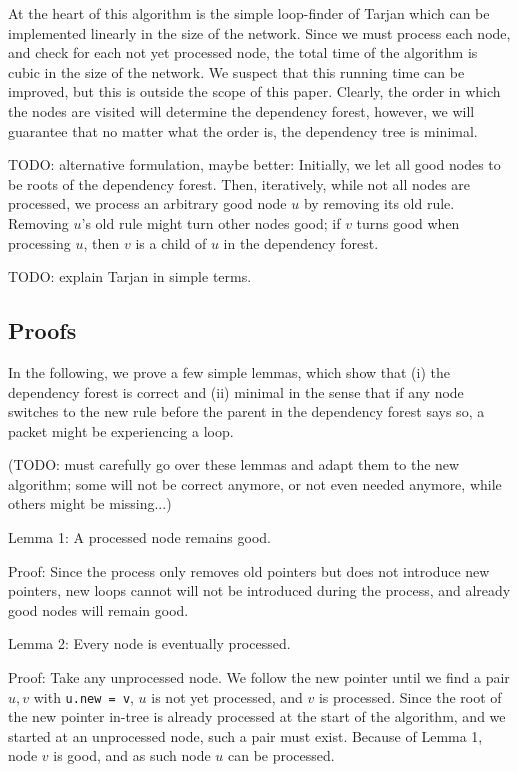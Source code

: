 At the heart of this algorithm is the simple loop-finder of Tarjan \cite{reference_1_in_http://en.wikipedia.org/wiki/Tarjan's_strongly_connected_components_algorithm} which can be implemented linearly in the size of the network. Since we must process each node, and check for each not yet processed node, the total time of the algorithm is cubic in the size of the network. We suspect that this running time can be improved, but this is outside the scope of this paper. Clearly, the order in which the nodes are visited will determine the dependency forest, however, we will guarantee that no matter what the order is, the dependency tree is minimal.

TODO: alternative formulation, maybe better: Initially, we let all good nodes to be roots of the dependency forest. Then, iteratively, while not all nodes are processed, we process an arbitrary good node $u$ by removing its old rule. Removing $u$'s old rule might turn other nodes good; if $v$ turns good when processing $u$, then $v$ is a child of $u$ in the dependency forest.

TODO: explain Tarjan in simple terms. 

\subsection{Proofs} %

In the following, we prove a few simple lemmas, which show that (i) the dependency forest is correct and (ii) minimal in the sense that if any node switches to the new rule before the parent in the dependency forest says so, a packet might be experiencing a loop.

(TODO: must carefully go over these lemmas and adapt them to the new algorithm; some will not be correct anymore, or not even needed anymore, while others might be missing...)

Lemma 1: A processed node remains good.

Proof: Since the process only removes old pointers but does not introduce new pointers, new loops cannot will not be introduced during the process, and already good nodes will remain good.

Lemma 2: Every node is eventually processed.

Proof: Take any unprocessed node. We follow the new pointer until we find a pair $u,v$ with \texttt{u.new = v}, $u$ is not yet processed, and $v$ is processed. Since the root of the new pointer in-tree is already processed at the start of the algorithm, and we started at an unprocessed node, such a pair must exist. Because of Lemma 1, node $v$ is good, and as such node $u$ can be processed.

